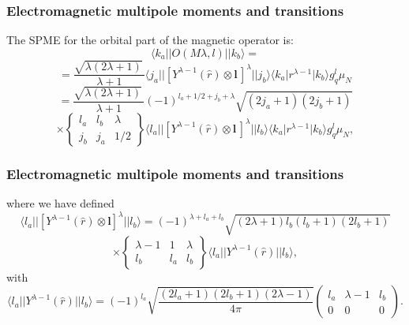 \documentclass{beamer}
\begin{document}
\begin{frame}
\frametitle{Electromagnetic multipole moments and transitions}

\begin{block}{}
The SPME for the orbital part of the magnetic operator is:
\[
\langle k_{a}\vert\vert O(M\lambda ,l )\vert\vert k_{b}\rangle=
\]
\[
= \frac{\sqrt{\lambda (2\lambda +1)}\, }{\lambda +1}
\langle j_{a}\vert\vert [Y^{\lambda -1}(\hat{r})\otimes\mathbf{l}\,]^{\lambda }\vert\vert j_{b}\rangle
\langle k_{a}\vert r^{\lambda -1}\vert k_{b}\rangle g^{l }_{q}\mu _{N}
\]
\[
=\frac{\sqrt{\lambda (2\lambda +1)}\, }{\lambda +1}(-1)^{l _{a}+1/2+j_{b}+\lambda } \sqrt{(2j_{a}+1)(2j_{b}+1)}
\]
\[
\times\left\{\begin{array}{ccc}  {l _{a}} &  {l _{b}} & {\lambda} \\  {j_{b}}&  {j_{a}}&  {1/2}\end{array}\right\}
\langle l _{a}\vert\vert [Y^{\lambda -1}(\hat{r})\otimes\mathbf{l}\,]^{\lambda }\vert\vert l _{b}\rangle
\langle k_{a}\vert r^{\lambda -1}\vert k_{b}\rangle g^{l }_{q}\mu _{N}, 
\]
\end{block}
\end{frame}

\begin{frame}
\frametitle{Electromagnetic multipole moments and transitions}

\begin{block}{}
where we have defined
\[
\langle l _{a}\vert\vert [Y^{\lambda -1}(\hat{r})\otimes\mathbf{l}]^{\lambda }\vert\vert l _{b}\rangle=(-1)^{\lambda +l _{a}+l _{b}} \sqrt{(2\lambda +1)l _{b}(l _{b}+1)(2l _{b}+1)}
\]
\[
\times\left\{\begin{array}{ccc}  {\lambda -1} & {1}&  {\lambda}\\   {l _{b}}&  {l _{a}} &  {l _{b}} \end{array}\right\}
\langle l _{a}\vert\vert Y^{\lambda -1}(\hat{r})\vert\vert l _{b}\rangle,
\]
with
\[
\langle l _{a}\vert\vert Y^{\lambda -1}(\hat{r})\vert\vert l _{b}\rangle=(-1)^{l _{a}} \sqrt{\frac{(2l _{a}+1)(2l _{b}+1)(2\lambda -1)}{4\pi }}\left(\begin{array}{ccc}  {l _{a}} & {\lambda -1} & {l _{b}}\\  {0} & {0}&  {0}\end{array}\right)
. 
\]
\end{block}
\end{frame}
\end{document}
